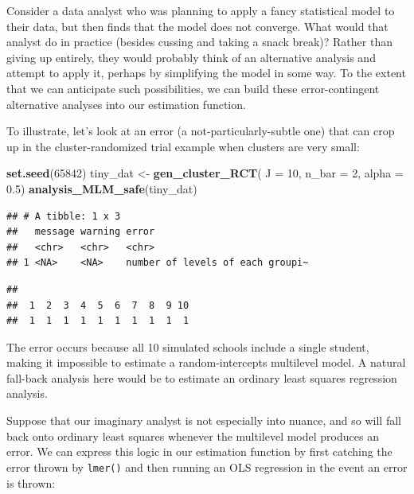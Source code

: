 \documentclass[
]{book}
\newenvironment{Shaded}{\begin{snugshade}}{\end{snugshade}}
\newcommand{\AttributeTok}[1]{\textcolor[rgb]{0.13,0.29,0.53}{#1}}
\newcommand{\DecValTok}[1]{\textcolor[rgb]{0.00,0.00,0.81}{#1}}
\newcommand{\FloatTok}[1]{\textcolor[rgb]{0.00,0.00,0.81}{#1}}
\newcommand{\FunctionTok}[1]{\textcolor[rgb]{0.13,0.29,0.53}{\textbf{#1}}}
\newcommand{\NormalTok}[1]{#1}
\newcommand{\OtherTok}[1]{\textcolor[rgb]{0.56,0.35,0.01}{#1}}
\newcommand{\SpecialCharTok}[1]{\textcolor[rgb]{0.81,0.36,0.00}{\textbf{#1}}}
\begin{document}
Consider a data analyst who was planning to apply a fancy statistical model to their data, but then finds that the model does not converge.
What would that analyst do in practice (besides cussing and taking a snack break)?
Rather than giving up entirely, they would probably think of an alternative analysis and attempt to apply it, perhaps by simplifying the model in some way.
To the extent that we can anticipate such possibilities, we can build these error-contingent alternative analyses into our estimation function.

To illustrate, let's look at an error (a not-particularly-subtle one) that can crop up in the cluster-randomized trial example when clusters are very small:

\begin{Shaded}
\begin{Highlighting}[]
\FunctionTok{set.seed}\NormalTok{(}\DecValTok{65842}\NormalTok{)}
\NormalTok{tiny\_dat }\OtherTok{\textless{}{-}} \FunctionTok{gen\_cluster\_RCT}\NormalTok{( }\AttributeTok{J =} \DecValTok{10}\NormalTok{, }\AttributeTok{n\_bar =} \DecValTok{2}\NormalTok{, }\AttributeTok{alpha =} \FloatTok{0.5}\NormalTok{)}
\FunctionTok{analysis\_MLM\_safe}\NormalTok{(tiny\_dat)}
\end{Highlighting}
\end{Shaded}

\begin{verbatim}
## # A tibble: 1 x 3
##   message warning error                           
##   <chr>   <chr>   <chr>                           
## 1 <NA>    <NA>    number of levels of each groupi~
\end{verbatim}

\begin{Shaded}
\end{Shaded}

\begin{verbatim}
## 
##  1  2  3  4  5  6  7  8  9 10 
##  1  1  1  1  1  1  1  1  1  1
\end{verbatim}

The error occurs because all 10 simulated schools include a single student, making it impossible to estimate a random-intercepts multilevel model.
A natural fall-back analysis here would be to estimate an ordinary least squares regression analysis.

Suppose that our imaginary analyst is not especially into nuance, and so will fall back onto ordinary least squares whenever the multilevel model produces an error.
We can express this logic in our estimation function by first catching the error thrown by \texttt{lmer()} and then running an OLS regression in the event an error is thrown:
\end{document}
